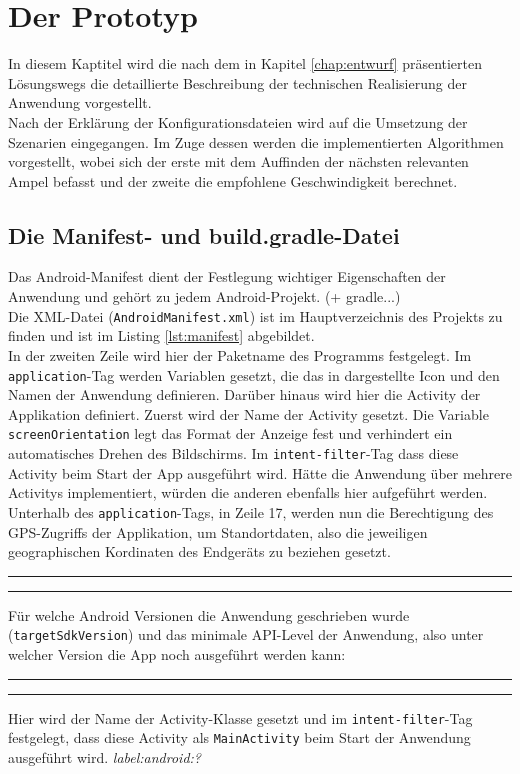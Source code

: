 \chapter{\label{chap:implementierung}Der Prototyp}
In diesem Kaptitel wird die nach dem in Kapitel \ref{chap:entwurf} präsentierten Lösungswegs die detaillierte Beschreibung der technischen Realisierung der Anwendung vorgestellt.\\
Nach der Erklärung der Konfigurationsdateien wird auf die Umsetzung der Szenarien eingegangen. Im Zuge dessen werden die implementierten Algorithmen vorgestellt, wobei sich der erste mit dem Auffinden der nächsten relevanten Ampel befasst und der zweite die empfohlene Geschwindigkeit berechnet.
\section{Die Manifest- und build.gradle-Datei}
Das Android-Manifest dient der Festlegung wichtiger Eigenschaften der Anwendung und gehört zu jedem Android-Projekt. (+ gradle...)\\

Die \gls{XML}-Datei (\texttt{AndroidManifest.xml}) ist im Hauptverzeichnis des Projekts zu finden und ist im Listing \ref{lst:manifest} abgebildet. \\
In der zweiten Zeile wird hier der Paketname des Programms festgelegt. 
Im \texttt{application}-Tag werden Variablen gesetzt, die das in dargestellte Icon und den Namen der Anwendung definieren. Darüber hinaus wird hier die \gls{Activity} der Applikation definiert. Zuerst wird der Name der \gls{Activity} gesetzt. Die Variable \texttt{screenOrientation} legt das Format der Anzeige fest und verhindert ein automatisches Drehen des Bildschirms. Im \texttt{intent-filter}-Tag dass diese Activity beim Start der App ausgeführt wird. Hätte die Anwendung über mehrere \glspl{Activity} implementiert, würden die anderen ebenfalls hier aufgeführt werden.\\
Unterhalb des \texttt{application}-Tags, in Zeile 17, werden nun die Berechtigung des \gls{GPS}-Zugriffs der Applikation, um Standortdaten, also die jeweiligen geographischen Kordinaten des Endgeräts zu beziehen gesetzt.
\begin{center}
\rule{35em}{0.5pt} 
 \rule{35em}{0.5pt}
\end{center}
Für welche Android Versionen die Anwendung geschrieben wurde (\texttt{targetSdkVersion}) und das minimale \gls{API}-Level der Anwendung, also unter welcher Version die App noch ausgeführt werden kann:\\
\begin{center}
\rule{35em}{0.5pt}  \rule{35em}{0.5pt}
\end{center}
Hier wird der Name der \gls{Activity}-Klasse gesetzt und im \texttt{intent-filter}-Tag festgelegt, dass diese \gls{Activity} als \texttt{MainActivity} beim Start der Anwendung ausgeführt wird. \textit{label:android:?}
